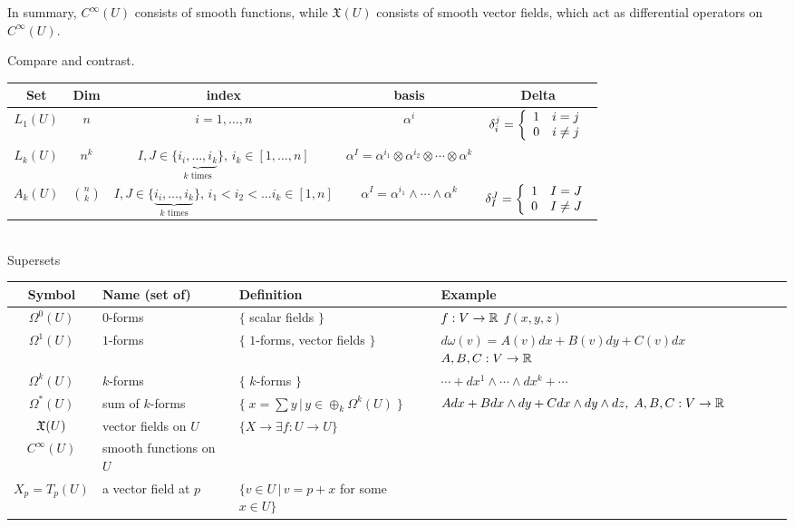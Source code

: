 \documentclass[10pt,a4paper]{report}
\begin{document}
In summary, \( C^\infty(U) \) consists of smooth functions, while \( \mathfrak{X}(U) \) consists of smooth vector fields, which act as differential operators on \( C^\infty(U) \).

\newpage
Compare and contrast.\\

\begin{tabular}{|c|c|c|c|c|}
	\hline
	Set & Dim & index & basis & Delta \\
	\hline
	$L_1(U)$ &$n$& $i = 1,\dots, n$ & $\alpha^i$ & $\delta_i^j = \left \{ \begin{array}{ll} 1 & i=j\\ 0& i \ne j \end{array} \right .$\\
	$L_k(U)$& $n^k$& $I,J \in \{ \underbrace{ i_i, \dots, i_k}_{k\text{ times}}\}, \, i_k\in[1,\dots, n]$ & $\alpha^I = \alpha^{i_1}\otimes\alpha^{i_2}\otimes\cdots\otimes\alpha^{k}$ & \\
	$A_k(U)$ &$\binom{n}{k}$& $I,J \in \{ \underbrace{ i_i, \dots, i_k}_{k\text{ times}}\}, \, i_1<i_2<\dots i_k \in [1, n]$ & $\alpha^I = \alpha^{i_1}\wedge\cdots\wedge\alpha^k$ & $\delta_I^J =\left \{ \begin{array}{ll} 1 & I=J\\ 0& I \ne J \end{array} \right .$ \\	\hline 
\end{tabular}\\

Supersets \\

\begin{tabular}{|c|l|l|p{6cm}|}
	\hline
	Symbol & Name (set of) & Definition & Example \\
	\hline
	$\Omega^0(U)$ & $0$-forms & $\{ $ scalar fields  $\}$ & $f: V \to \mathbb{R}$ $f(x,y,z)$\\
	\hline
	$\Omega^1(U)$ & $1$-forms & $\{$ $ 1$-forms, vector fields $\}$ & $d\omega(v) = A(v)dx+B(v)dy+C(v)dx$ $A,B,C: V \to \mathbb{R}$\\
	\hline
	$\Omega^k(U)$ & $k$-forms & $\{$ $ k$-forms $\}$ & $\cdots + dx^1 \wedge \cdots \wedge dx^k + \cdots$ \\
	\hline
	$\Omega^*(U)$ & sum of $k$-forms & $\{\;x=\sum y\,|\, y\in \oplus_k \Omega^k(U) \;\}$ & $ Adx + Bdx \wedge dy + Cdx \wedge dy \wedge dz,\; A,B,C : V \to \mathbb{R}$\\
	\hline
	$\mathfrak{X}(U)$ & vector fields on $U$ & $\{ X \to \exists f:U\to U\}$&\\
	\hline
	$C^\infty(U)$ & smooth functions on $U$ & &\\
	\hline
	$X_p = T_p(U)$ & a vector field at $p$ & $\{ v \in U \,|\, v = p + x$ for some $x \in U\}$&\\
	\hline
\end{tabular}\\
\end{document}

